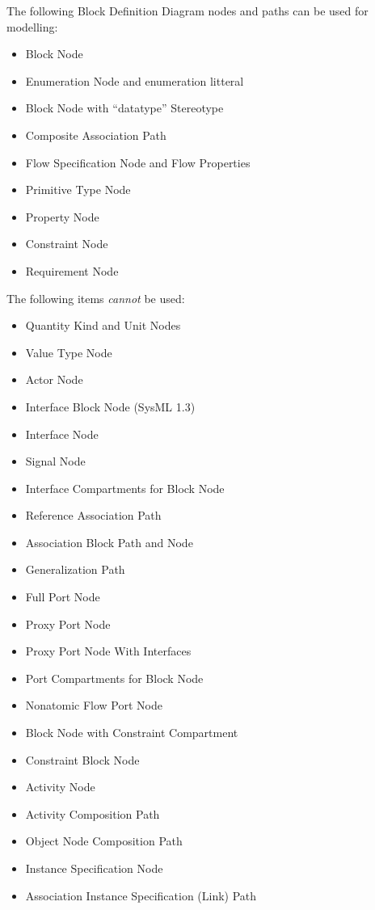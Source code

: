 The following Block Definition Diagram nodes and paths can be used for
modelling:
\begin{itemize}
\item Block Node 
\item Enumeration Node  and enumeration litteral
\item Block Node with ``datatype'' Stereotype 
\item Composite Association Path 
\item Flow Specification Node  and Flow Properties
\item Primitive Type Node
\item Property Node
\item Constraint Node
\item Requirement Node
\end{itemize}

The following items \emph{cannot} be used:
\begin{itemize}
\item Quantity Kind and Unit Nodes
\item Value Type Node
\item Actor Node
\item Interface Block Node (SysML 1.3)
\item Interface Node
\item Signal Node
\item Interface Compartments for Block Node
\item Reference Association Path
\item Association Block Path and Node
\item Generalization Path
\item Full Port Node
\item Proxy Port Node
\item Proxy Port Node With Interfaces
\item Port Compartments for Block Node
\item Nonatomic Flow Port Node
\item Block Node with Constraint Compartment
\item Constraint Block Node
\item Activity Node
\item Activity Composition Path
\item Object Node Composition Path
\item Instance Specification Node
\item Association Instance Specification (Link) Path
\end{itemize}

